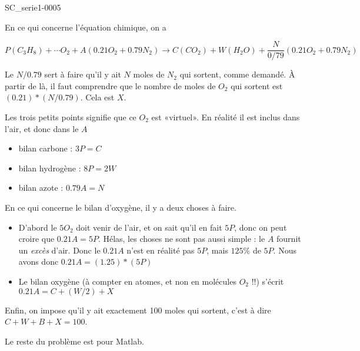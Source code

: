 \begin{corrige}{SC_serie1-0005}

	En ce qui concerne l'équation chimique, on a

	\begin{equation}
		P(C_3H_8) + \cdots O_2 + A(0.21 O_2 + 0.79 N_2) \to C (CO_2) + W(H_2O) + \frac{ N }{ 0/79 } (0.21 O_2 + 0.79 N_2)
	\end{equation}

Le $N/0.79$ sert à faire qu'il y ait $N$ moles de $N_2$ qui sortent, comme demandé. À partir de là, il faut comprendre que le nombre de moles de $O_2$ qui sortent est $(0.21)*(N/0.79)$. Cela est $X$.

 Les trois petits points signifie que ce $O_2$ est «virtuel». En réalité il est inclus dans l'air, et donc dans le $A$

\begin{itemize}
	\item 
bilan carbone : $3P = C$
\item
 bilan hydrogène : $8P = 2W$
 \item
 bilan azote : $0.79 A = N$
\end{itemize}

En ce qui concerne le bilan d'oxygène, il y a deux choses à faire.
\begin{itemize}
	\item  D'abord le $5O_2$ doit venir de l'air, et on sait qu'il en fait $5P$, donc on peut croire que $0.21A = 5P$. Hélas, les choses ne sont pas aussi simple : le $A$ fournit un \emph{excès} d'air. Donc le $0.21A$ n'est en réalité pas $5P$, mais $125\%$ de $5P$. Nous avons donc $0.21A = (1.25)*(5P)$
	\item Le bilan oxygène (à compter en atomes, et non en molécules $O_2$ !!) s'écrit $0.21 A = C+(W/2)+X$
\end{itemize}
Enfin, on impose qu'il y ait exactement 100 moles qui sortent, c'est à dire $C+W+B+X=100$.

Le reste du problème est pour Matlab.



\end{corrige}
